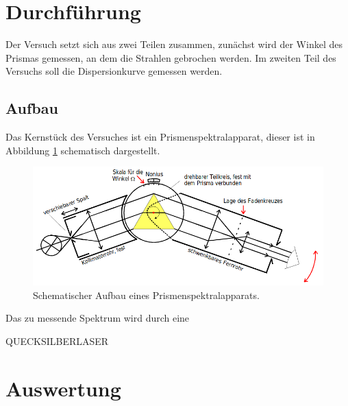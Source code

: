 \section{Durchführung}
Der Versuch setzt sich aus zwei Teilen zusammen, zunächst wird der Winkel des Prismas gemessen, an dem die Strahlen gebrochen werden. Im zweiten Teil des Versuchs
soll die Dispersionkurve gemessen werden.

\subsection{Aufbau}
Das Kernstück des Versuches ist ein Prismenspektralapparat, dieser ist in Abbildung \ref{abb:3} schematisch dargestellt.
\begin{figure}
  \centering
  \includegraphics[scale=0.4]{3.png}
  \caption{Schematischer Aufbau eines Prismenspektralapparats. \cite{Q1}}
  \label{abb:3}
\end{figure}
Das zu messende Spektrum wird durch eine


QUECKSILBERLASER

\section{Auswertung}
